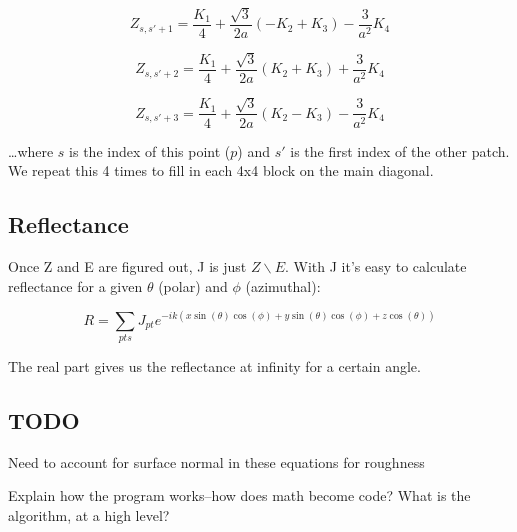 \documentclass[etd,oneside,senior]{BYUPhys}
\begin{document}
\begin{equation}
  Z_{s,s'+1}=\frac{K_{1}}{4}+\frac{\sqrt{3}}{2a}\left(-K_{2}+K_{3}\right)-\frac{3}{a^{2}}K_{4}
\end{equation}

\begin{equation}
  Z_{s,s'+2}=\frac{K_{1}}{4}+\frac{\sqrt{3}}{2a}\left(K_{2}+K_{3}\right)+\frac{3}{a^{2}}K_{4}
\end{equation}

\begin{equation}
  Z_{s,s'+3}=\frac{K_{1}}{4}+\frac{\sqrt{3}}{2a}\left(K_{2}-K_{3}\right)-\frac{3}{a^{2}}K_{4}
\end{equation}

\ldots where $s$ is the index of this point ($p$) and $s'$ is the first
index of the other patch. We repeat this 4 times to fill in each 4x4
block on the main diagonal.



\subsection{Reflectance}
Once Z and E are figured out, J is just $Z\backslash E$. With J it's easy to calculate reflectance for a given $\theta$ (polar) and $\phi$ (azimuthal):

\begin{equation}
  R=\sum_{pts}J_{pt}e^{-ik\left(x\sin\left(\theta\right)\cos\left(\phi\right)+y\sin\left(\theta\right)\cos\left(\phi\right)+z\cos\left(\theta\right)\right)}
\end{equation}

The real part gives us the reflectance at infinity for a certain angle.



\subsection{TODO}
Need to account for surface normal in these equations for roughness

Explain how the program works--how does math become code? What is the algorithm, at a high level?







\end{document}
